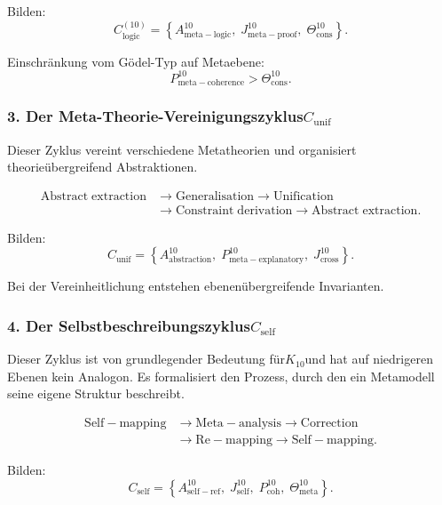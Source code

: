 Bilden:
\[
  C_{\mathrm{logic}}^{(10)}
   =
   \left\{
     A^{10}_{\mathrm{meta\!-\!logic}},\;
     J^{10}_{\mathrm{meta\!-\!proof}},\;
     \Theta^{10}_{\mathrm{cons}}
   \right\}.
\]

Einschränkung vom Gödel-Typ auf Metaebene:
\[
  P^{10}_{\mathrm{meta\!-\!coherence}}
    >
  \Theta^{10}_{\mathrm{cons}}.
\]


\subsubsection{3. Der Meta-Theorie-Vereinigungszyklus$C_{\mathrm{unif}}$}

Dieser Zyklus vereint verschiedene Metatheorien und organisiert theorieübergreifend
Abstraktionen.

\[
  \begin{aligned}
  \mathrm{Abstract\;extraction}
  &\to \mathrm{Generalisation}
  \to \mathrm{Unification}\\
  &\to \mathrm{Constraint\;derivation}
  \to \mathrm{Abstract\;extraction}.
  \end{aligned}
\]

Bilden:
\[
  C_{\mathrm{unif}}
    =
    \left\{
      A^{10}_{\mathrm{abstraction}},\;
      P^{10}_{\mathrm{meta\!-\!explanatory}},\;
      J^{10}_{\mathrm{cross}}
    \right\}.
\]

Bei der Vereinheitlichung entstehen ebenenübergreifende Invarianten.


\subsubsection{4. Der Selbstbeschreibungszyklus$C_{\mathrm{self}}$}

Dieser Zyklus ist von grundlegender Bedeutung für$K_{10}$und hat auf niedrigeren Ebenen kein Analogon.
Es formalisiert den Prozess, durch den ein Metamodell seine eigene Struktur beschreibt.

\[
  \begin{aligned}
  \mathrm{Self\!-\!mapping}
  &\to \mathrm{Meta\!-\!analysis}
  \to \mathrm{Correction}\\
  &\to \mathrm{Re\!-\!mapping}
  \to \mathrm{Self\!-\!mapping}.
  \end{aligned}
\]

Bilden:
\[
  C_{\mathrm{self}}
    =
    \left\{
      A^{10}_{\mathrm{self\!-\!ref}},\;
      J^{10}_{\mathrm{self}},\;
      P^{10}_{\mathrm{coh}},\;
      \Theta^{10}_{\mathrm{meta}}
    \right\}.
\]

